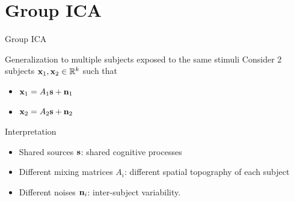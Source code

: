 \documentclass[bigger]{beamer}
\begin{document}
\section{Group ICA}
\label{sec:orgde83014}
\begin{frame}{Group ICA}
\begin{block}{Generalization to multiple subjects exposed to the same stimuli}
  Consider 2 subjects \(\mathbf{x}_1, \mathbf{x}_2 \in \mathbb{R}^k\) such that
  \begin{itemize}
  \item $\mathbf{x}_1 = A_1 \mathbf{s} + \mathbf{n}_1$
  \item $\mathbf{x}_2 = A_2 \mathbf{s} + \mathbf{n}_2$
  \end{itemize}
\end{block}
\begin{block}{Interpretation}
  \begin{itemize}
  \item Shared sources $\mathbf{s}$: shared cognitive processes 
  \item Different mixing matrices $A_i$: different spatial topography of each subject
  \item Different noises $\mathbf{n}_i$: inter-subject variability.
  \end{itemize}
\end{block}
\end{frame}
\end{document}
